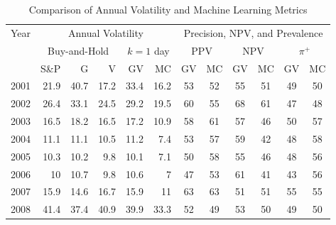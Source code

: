 \documentclass{article}
\begin{document}
\begin{table}[!ht]
    \centering
    \caption{Comparison of Annual Volatility and Machine Learning Metrics}
    \medskip
    \begin{tabular}{l || rrr || rr || cc||cc||cc}
    \hline
    \multirow{3}{*}{Year} & \multicolumn{5}{c||}{Annual Volatility} & \multicolumn{6}{c}{Precision, NPV, and Prevalence} \\
    \cline{2-12}
    & \multicolumn{3}{c||}{Buy-and-Hold}   
& \multicolumn{2}{c||}{$k=1$  day} 
& \multicolumn{2}{c}{PPV}  & \multicolumn{2}{c}{NPV} & \multicolumn{2}{c}{$\pi^+$}   \\ \cline{2-12}
 & S\&P & G & V  & GV  & MC  & GV & MC  & GV  & MC & GV & MC \\ \hline
      2001 & 21.9 & \cellcolor{red!25}40.7 & \cellcolor{green!25}17.2 & \cellcolor{red!25}33.4 & 16.2 & \cellcolor{green!25}53 & 52 & \cellcolor{green!25}55 & 51 & 49 & \cellcolor{green!25}50 \\ 
        2002 & 26.4 & \cellcolor{red!25}33.1 & \cellcolor{green!25}24.5 & \cellcolor{red!25}29.2 & 19.5 & \cellcolor{green!25}60 & 55 & \cellcolor{green!25}68 & 61 & 47 & \cellcolor{green!25}48 \\ 
        2003 & \cellcolor{green!25}16.5 & \cellcolor{red!25}18.2 & \cellcolor{green!25}16.5 & \cellcolor{red!25}17.2 & 10.9 & 58 & \cellcolor{green!25}61 & \cellcolor{green!25}57 & 46 & 50 & \cellcolor{green!25}57 \\ 
        2004 & \cellcolor{red!25}11.1 & \cellcolor{red!25}11.1 & \cellcolor{green!25}10.5 & \cellcolor{red!25}11.2 & 7.4 & 53 & \cellcolor{green!25}57 & \cellcolor{green!25}59 & 42 & 48 & \cellcolor{green!25}58 \\ 
        2005 & \cellcolor{red!25}10.3 & 10.2 & \cellcolor{green!25}9.8 & \cellcolor{red!25}10.1 & 7.1 & 50 & \cellcolor{green!25}58 & \cellcolor{green!25}55 & 46 & 48 & \cellcolor{green!25}56 \\ 
        2006 & 10 & \cellcolor{red!25}10.7 & \cellcolor{green!25}9.8 & \cellcolor{red!25}10.6 & 7 & 47 & \cellcolor{green!25}53 & \cellcolor{green!25}61 & 41 & 43 & \cellcolor{green!25}56 \\ 
        2007 & 15.9 & \cellcolor{green!25}14.6 & \cellcolor{red!25}16.7 & \cellcolor{red!25}15.9 & 11 & 63 & \cellcolor{green!25}63 & \cellcolor{green!25}51 & 51 & 55 & \cellcolor{green!25}55 \\ 
        2008 & \cellcolor{red!25}41.4 & \cellcolor{green!25}37.4 & 40.9 & \cellcolor{red!25}39.9 & 33.3 & \cellcolor{green!25}52 & 49 & \cellcolor{green!25}53 & 50 & 49 & \cellcolor{green!25}50 \\ 

\end{tabular}
\end{table}
\end{document}
